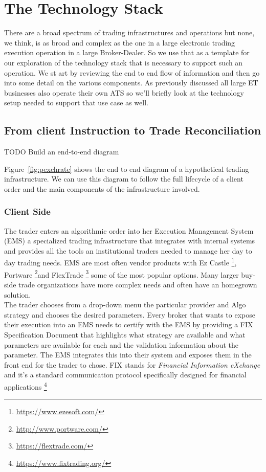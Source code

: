 
\chapter{The Technology Stack}\label{chap:ch_tech}
There are a broad spectrum of trading infrastructures and operations but none, we think, is as broad and complex as the one in a large electronic trading execution operation in a large Broker-Dealer. So we use that as a template for our exploration of the technology stack that is necessary to support such an operation. We st  art by reviewing the end to end flow of information and then go into some detail on the various components. As previously discussed all large ET businesses also operate their own ATS so we'll briefly look at the technology setup needed to support that use case as well.\\

\section{From client Instruction to Trade Reconciliation}
TODO Build an end-to-end diagram

Figure~\ref{fig:pexchrate} shows the end to end diagram of a hypothetical trading infrastructure. We can use this diagram to follow the full lifecycle of a client order and the main components of the infrastructure involved.
\subsection{Client Side}
The trader enters an algorithmic order into her Execution Management System (EMS) a specialized trading infrastructure that integrates with internal systems and provides all the tools an institutional traders needed to manage her day to day trading needs. EMS are most often vendor products with Ez Castle \footnote{\url{https://www.ezesoft.com/}}, Portware \footnote{\url{http://www.portware.com/}}and FlexTrade \footnote{\url{https://flextrade.com/}} some of the most popular options. Many larger buy-side trade organizations have more complex needs and often have an homegrown solution.\\

The trader chooses from a drop-down menu the particular provider and Algo strategy and  chooses the desired parameters. Every broker that wants to expose their execution into an EMS needs to certify with the EMS by providing a FIX Specification Document that highlights what strategy are available and what parameters are available for each and the validation information about the parameter. The EMS integrates this into their system and exposes them in the front end for the trader to chose. FIX stands for \emph{Financial Information eXchange} and it's a standard communication protocol specifically designed for financial applications \footnote{\url{https://www.fixtrading.org/}}\\

